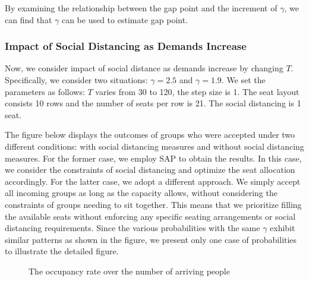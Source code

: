 By examining the relationship between the gap point and the increment of $\gamma$, we can find that $\gamma$ can be used to estimate gap point.

\subsubsection{Impact of Social Distancing as Demands Increase}
Now, we consider impact of social distance as demands increase by changing $T$. Specifically, we consider two situations: $\gamma = 2.5$ and $\gamma = 1.9$. We set the parameters as follows: $T$ varies from 30 to 120, the step size is 1.  The seat layout consists 10 rows and the number of seats per row is 21. The social distancing is 1 seat.

The figure below displays the outcomes of groups who were accepted under two different conditions: with social distancing measures and without social distancing measures. For the former case, we employ SAP to obtain the results. In this case, we consider the constraints of social distancing and optimize the seat allocation accordingly. For the latter case, we adopt a different approach. We simply accept all incoming groups as long as the capacity allows, without considering the constraints of groups needing to sit together. This means that we prioritize filling the available seats without enforcing any specific seating arrangements or social distancing requirements. Since the various probabilities with the same $\gamma$ exhibit similar patterns as shown in the figure, we present only one case of probabilities to illustrate the detailed figure.

\begin{figure}[h]
  \centering
  \caption{The occupancy rate over the number of arriving people}
  \label{Fig.lable}
\end{figure}

